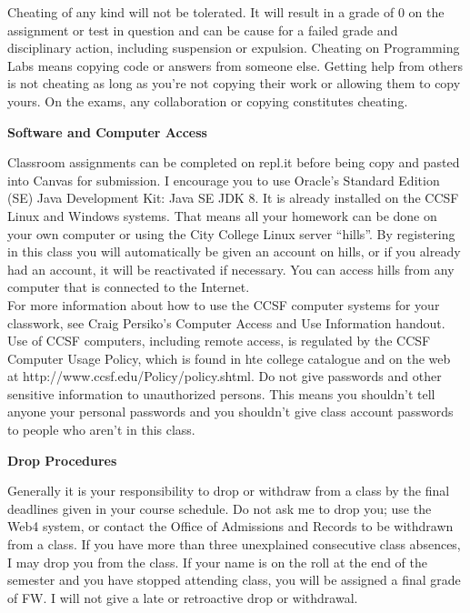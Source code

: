 \documentclass[11pt]{article}
\begin{document}
\hspace{3mm}

Cheating of any kind will not be tolerated. It will result in a grade of 0 on
the assignment or test in question and can be cause for a failed grade and
disciplinary action, including suspension or expulsion. Cheating on Programming
Labs means copying code or answers from someone else. Getting help from others
is not cheating as long as you're not copying their work or allowing them to
copy yours. On the exams, any collaboration or copying constitutes cheating.

\hspace{3mm}

\textbf{Software and Computer Access}

\hspace{3mm}

Classroom assignments can be completed on repl.it before being copy and pasted
into Canvas for submission. I encourage you to use Oracle's Standard Edition
(SE) Java Development Kit: Java SE JDK 8. It is already installed on the CCSF
Linux and Windows systems. That means all your homework can be done on your own
computer or using the City College Linux server ``hills''. By registering in
this class you will automatically be given an account on hills, or if you
already had an account, it will be reactivated if necessary. You can access
hills from any computer that is connected to the Internet.\\

For more information about how to use the CCSF computer systems for your
classwork, see Craig Persiko's Computer Access and Use Information handout.\\

Use of CCSF computers, including remote access, is regulated by the CCSF
Computer Usage Policy, which is found in hte college catalogue and on the web
at http://www.ccsf.edu/Policy/policy.shtml. Do not give passwords and other
sensitive information to unauthorized persons. This means you shouldn't tell
anyone your personal passwords and you shouldn't give class account passwords
to people who aren't in this class.

\hspace{3mm}

\textbf{Drop Procedures}

\hspace{3mm}

Generally it is your responsibility to drop or withdraw from a class by the
final deadlines given in your course schedule. Do not ask me to drop you; use
the Web4 system, or contact the Office of Admissions and Records to be
withdrawn from a class. If you have more than three unexplained consecutive
class absences, I may drop you from the class. If your name is on the roll at
the end of the semester and you have stopped attending class, you will be
assigned a final grade of FW. I will not give a late or retroactive drop or
withdrawal.
\end{document}
